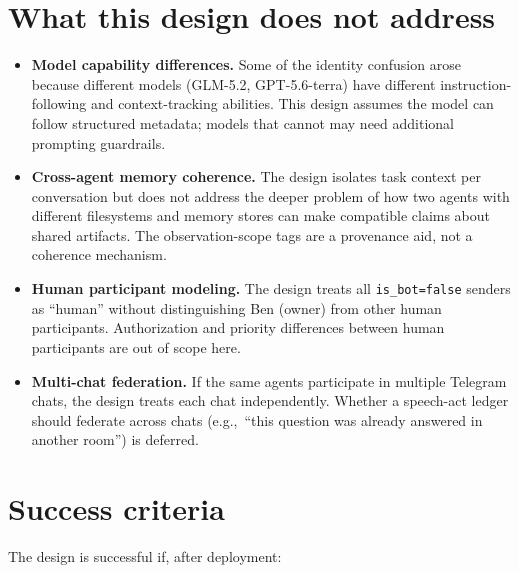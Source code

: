 \documentclass[11pt]{article}
\begin{document}
\section{What this design does not address}

\begin{itemize}
\item \textbf{Model capability differences.}  Some of the identity confusion
arose because different models (GLM-5.2, GPT-5.6-terra) have different
instruction-following and context-tracking abilities.  This design assumes
the model can follow structured metadata; models that cannot may need
additional prompting guardrails.

\item \textbf{Cross-agent memory coherence.}  The design isolates task
context per conversation but does not address the deeper problem of how two
agents with different filesystems and memory stores can make compatible
claims about shared artifacts.  The observation-scope tags are a
provenance aid, not a coherence mechanism.

\item \textbf{Human participant modeling.}  The design treats all
\texttt{is\_bot=false} senders as ``human'' without distinguishing Ben
(owner) from other human participants.  Authorization and priority
differences between human participants are out of scope here.

\item \textbf{Multi-chat federation.}  If the same agents participate in
multiple Telegram chats, the design treats each chat independently.  Whether
a speech-act ledger should federate across chats (e.g.,\ ``this question was
already answered in another room'') is deferred.
\end{itemize}

\section{Success criteria}

The design is successful if, after deployment:
\end{document}
